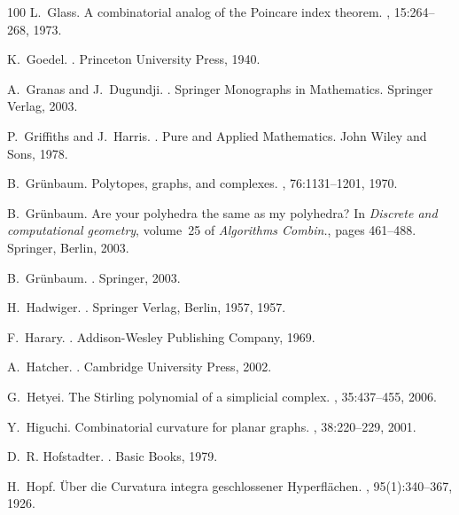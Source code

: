 \documentclass[12pt]{amsart}
\begin{document}
\begin{thebibliography}{100}
L.~Glass.
\newblock A combinatorial analog of the {P}oincare index theorem.
, 15:264--268, 1973.

K.~Goedel.
.
\newblock Princeton University Press, 1940.

A.~Granas and J.~Dugundji.
.
\newblock Springer Monographs in Mathematics. Springer Verlag, 2003.

P.~Griffiths and J.~Harris.
.
\newblock Pure and Applied Mathematics. John Wiley and Sons, 1978.

B.~Gr{\"u}nbaum.
\newblock Polytopes, graphs, and complexes.
, 76:1131--1201, 1970.

B.~Gr{\"u}nbaum.
\newblock Are your polyhedra the same as my polyhedra?
\newblock In {\em Discrete and computational geometry}, volume~25 of {\em
  Algorithms Combin.}, pages 461--488. Springer, Berlin, 2003.

B.~Gr\"unbaum.
.
\newblock Springer, 2003.

H.~Hadwiger.
.
\newblock Springer Verlag, Berlin, 1957, 1957.

F.~Harary.
.
\newblock Addison-Wesley Publishing Company, 1969.

A.~Hatcher.
.
\newblock Cambridge University Press, 2002.

G.~Hetyei.
\newblock The {S}tirling polynomial of a simplicial complex.
, 35:437--455, 2006.

Y.~Higuchi.
\newblock Combinatorial curvature for planar graphs.
, 38:220--229, 2001.

D.~R. Hofstadter.
.
\newblock Basic Books, 1979.

H.~Hopf.
\newblock \"{U}ber die {C}urvatura integra geschlossener {H}yperfl\"{a}chen.
, 95(1):340--367, 1926.


\end{thebibliography}
\end{document}
